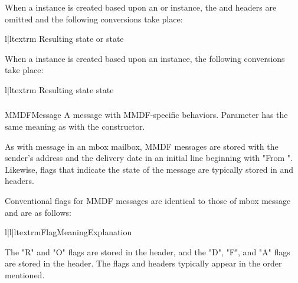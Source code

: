 When a  instance is created based upon an
 or  instance, the 
and  headers are omitted and the following conversions
take place:

\begin{tableii}{l|l}{textrm}
    {Resulting state}{ or  state}
\end{tableii}

When a  instance is created based upon an 
instance, the following conversions take place:

\begin{tableii}{l|l}{textrm}
    {Resulting state}{ state}
\end{tableii}

\subsubsection{}
\label{mailbox-mmdfmessage}

\begin{classdesc}{MMDFMessage}{}
A message with MMDF-specific behaviors. Parameter  has the same
meaning as with the  constructor.
\end{classdesc}

As with message in an mbox mailbox, MMDF messages are stored with the sender's
address and the delivery date in an initial line beginning with "From ".
Likewise, flags that indicate the state of the message are typically stored in
 and  headers.

Conventional flags for MMDF messages are identical to those of mbox message and
are as follows:

\begin{tableiii}{l|l|l}{textrm}{Flag}{Meaning}{Explanation}
\end{tableiii}

The "R" and "O" flags are stored in the  header, and the
"D", "F", and "A" flags are stored in the  header. The
flags and headers typically appear in the order mentioned.

